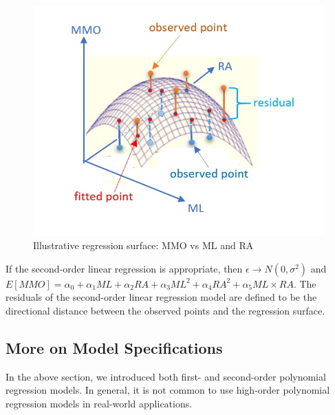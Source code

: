 \documentclass[
]{book}
\begin{document}
\begin{figure}[!ht]

{\centering \includegraphics[width=9.29in,]{img04/w04-RegressionSurface} 

}

\caption{Illustrative regression surface: MMO vs ML and RA}\label{fig:w10-RegressionSurface}
\end{figure}

If the second-order linear regression is appropriate, then \(\epsilon \to N(0, \sigma^2)\) and \(E[MMO] = \alpha_0 + \alpha_1 ML + \alpha_2 RA + \alpha_3 ML^2 + \alpha_4 RA^2 + \alpha_5 ML\times RA\). The residuals of the second-order linear regression model are defined to be the directional distance between the observed points and the regression surface.

\hypertarget{more-on-model-specifications}{%
\subsection{More on Model Specifications}\label{more-on-model-specifications}}

In the above section, we introduced both first- and second-order polynomial regression models. In general, it is not common to use high-order polynomial regression models in real-world applications.
\end{document}

